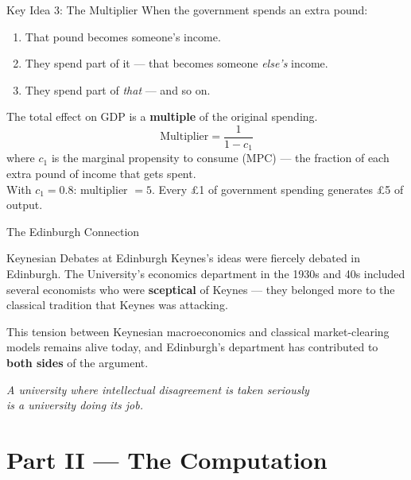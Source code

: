 \documentclass[aspectratio=169, 10pt]{beamer}
\begin{document}
\begin{frame}{Key Idea 3: The Multiplier}
When the government spends an extra pound:
\vspace{0.3em}
\begin{enumerate}
  \item That pound becomes someone's income.
  \item They spend part of it --- that becomes someone \textit{else's} income.
  \item They spend part of \textit{that} --- and so on.
\end{enumerate}
\vspace{0.3em}
The total effect on GDP is a \textbf{multiple} of the original spending.
\vspace{0.5em}
\[
  \text{Multiplier} = \frac{1}{1 - c_1}
\]
\vspace{0.3em}
where $c_1$ is the \alert{marginal propensity to consume} (MPC) ---
the fraction of each extra pound of income that gets spent.\\[6pt]
With $c_1 = 0.8$: multiplier $= 5$. Every \pounds1 of government spending
generates \pounds5 of output.
\end{frame}

\begin{frame}{The Edinburgh Connection}
\begin{block}{Keynesian Debates at Edinburgh}
Keynes's ideas were fiercely debated in Edinburgh. The University's economics
department in the 1930s and 40s included several economists who were
\textbf{sceptical} of Keynes --- they belonged more to the classical tradition
that Keynes was attacking.
\end{block}
\vspace{0.5em}
This tension between Keynesian macroeconomics and classical market-clearing
models remains alive today, and Edinburgh's department has contributed to
\textbf{both sides} of the argument.
\vspace{0.5em}
\begin{center}
\textit{A university where intellectual disagreement is taken seriously\\
is a university doing its job.}
\end{center}
\end{frame}

\section{Part II --- The Computation}
\end{document}
